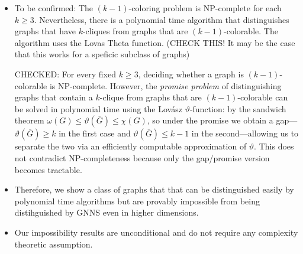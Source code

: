 \begin{itemize}
    \item To be confirmed: The $(k-1)$-coloring problem is NP-complete for each $k\geq3$. Nevertheless, there is a polynomial time algorithm that distinguishes graphs 
that have $k$-cliques from graphs that are $(k-1)$-colorable. The algorithm uses the Lovas Theta function. (CHECK THIS! It may be the case that this works for a speficic subclass of graphs)

    CHECKED: For every fixed $k \ge 3$, deciding whether a graph is $(k-1)$-colorable is NP-complete. However, the \emph{promise problem} of distinguishing graphs that contain a $k$-clique from graphs that are $(k-1)$-colorable can be solved in polynomial time using the Lovász $\vartheta$-function: by the sandwich theorem $\omega(G) \le \vartheta(\overline{G}) \le \chi(G)$, so under the promise we obtain a gap---$\vartheta(\overline{G}) \ge k$ in the first case and $\vartheta(\overline{G}) \le k-1$ in the second---allowing us to separate the two via an efficiently computable approximation of $\vartheta$. This does not contradict NP-completeness because only the gap/promise version becomes tractable.

    \item Therefore, we show a class of graphs that that can be distinguished easily by polynomial time algorithms but are provably impossible from being distihguished by GNNS even in higher dimensions.

  \item  Our impossibility results are unconditional and do not require any complexity theoretic assumption. 
     
  
\end{itemize}




